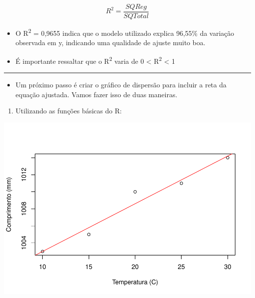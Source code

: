 \documentclass[
]{book}
\newenvironment{Shaded}{\begin{snugshade}}{\end{snugshade}}
\newcommand{\AttributeTok}[1]{\textcolor[rgb]{0.13,0.29,0.53}{#1}}
\newcommand{\FunctionTok}[1]{\textcolor[rgb]{0.13,0.29,0.53}{\textbf{#1}}}
\newcommand{\NormalTok}[1]{#1}
\newcommand{\SpecialCharTok}[1]{\textcolor[rgb]{0.81,0.36,0.00}{\textbf{#1}}}
\newcommand{\StringTok}[1]{\textcolor[rgb]{0.31,0.60,0.02}{#1}}
\providecommand{\tightlist}{%
  \setlength{\itemsep}{0pt}\setlength{\parskip}{0pt}}
\begin{document}
\[R^{2}= \frac{SQReg}{SQTotal}\]

\begin{itemize}
\item
  O R\textsuperscript{2} = 0,9655 indica que o modelo utilizado explica 96,55\% da variação observada em y, indicando uma qualidade de ajuste muito boa.
\item
  É importante ressaltar que o R\textsuperscript{2} varia de 0 \textless{} R\textsuperscript{2} \textless{} 1
\end{itemize}

\begin{center}\rule{0.5\linewidth}{0.5pt}\end{center}

\begin{itemize}
\tightlist
\item
  Um próximo passo é criar o gráfico de dispersão para incluir a reta da equação ajustada. Vamos fazer isso de duas maneiras.
\end{itemize}

\begin{enumerate}
\def\labelenumi{\arabic{enumi}.}
\tightlist
\item
  Utilizando as funções básicas do R:
\end{enumerate}

\begin{Shaded}
\end{Shaded}

\includegraphics[width=0.5\linewidth]{_main_files/figure-latex/graph1-1}
\end{document}
